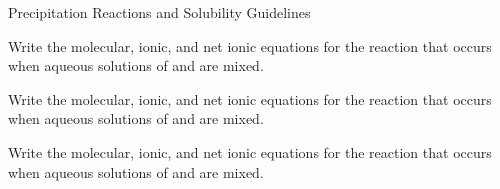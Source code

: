 \documentclass[handout]{beamer}
\begin{document}
\begin{frame}[allowframebreaks]{Precipitation Reactions and Solubility
	Guidelines}
	\framebreak

	Write the molecular, ionic, and net ionic equations for the reaction
	that occurs when aqueous solutions of  and  are
	mixed.

	\vfill

	\framebreak

	Write the molecular, ionic, and net ionic equations for the reaction
	that occurs when aqueous solutions of  and  are
	mixed.

	\vfill

	\framebreak

	Write the molecular, ionic, and net ionic equations for the reaction
	that occurs when aqueous solutions of  and  are
	mixed.

	\vfill
\end{frame}
\end{document}
